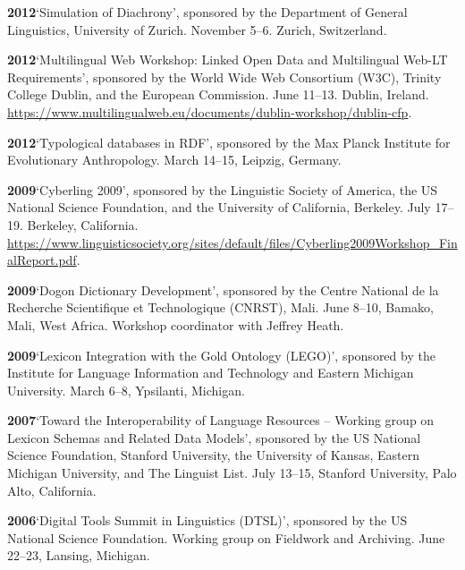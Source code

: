 \documentclass[11pt]{article}
\newcommand{\hangpara}{
 \setlength{\parindent}{0in} %
 \hangindent=0.42in %
}
\begin{document}
\vskip 6pt
\hangpara
{\bf 2012}\hspace{1ex}`Simulation of Diachrony', sponsored by the Department of General Linguistics, University of Zurich. November 5--6. Zurich, Switzerland.

\vskip 6pt
\hangpara
{\bf 2012}\hspace{1ex}`Multilingual Web Workshop: Linked Open Data and Multilingual Web-LT Requirements', sponsored by the World Wide Web Consortium (W3C), Trinity College Dublin, and the European Commission. June 11--13. Dublin, Ireland. \url{https://www.multilingualweb.eu/documents/dublin-workshop/dublin-cfp}.

\vskip 6pt
\hangpara
{\bf 2012}\hspace{1ex}`Typological databases in RDF', sponsored by the Max Planck Institute for Evolutionary Anthropology. March 14--15, Leipzig, Germany. 

\vskip 6pt
\hangpara
{\bf 2009}\hspace{1ex}`Cyberling 2009', sponsored by the Linguistic Society of America, the US National Science Foundation, and the University of California, Berkeley. July 17--19. Berkeley, California. \small\url{https://www.linguisticsociety.org/sites/default/files/Cyberling2009Workshop_FinalReport.pdf}.

\vskip 6pt
\hangpara
{\bf 2009}\hspace{1ex}`Dogon Dictionary Development', sponsored by the Centre National de la Recherche Scientifique et Technologique (CNRST), Mali. June 8--10, Bamako, Mali, West Africa. Workshop coordinator with Jeffrey Heath.

\vskip 6pt
\hangpara
{\bf 2009}\hspace{1ex}`Lexicon Integration with the Gold Ontology (LEGO)', sponsored by the Institute for Language Information and Technology and Eastern Michigan University. March 6--8, Ypsilanti, Michigan.

\vskip 6pt
\hangpara
{\bf 2007}\hspace{1ex}`Toward the Interoperability of Language Resources -- Working group on Lexicon Schemas and Related Data Models', sponsored by the US National Science Foundation, Stanford University, the University of Kansas, Eastern Michigan University, and The Linguist List. July 13--15, Stanford University, Palo Alto, California.

\vskip 6pt
\hangpara
{\bf 2006}\hspace{1ex}`Digital Tools Summit in Linguistics (DTSL)', sponsored by the US National Science Foundation. Working group on Fieldwork and Archiving. June 22--23, Lansing, Michigan.
\end{document}
